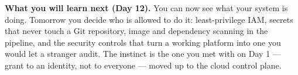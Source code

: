 \begin{keyidea}
\textbf{What you will learn next (Day 12).} You can now see what your system is doing. Tomorrow you decide who is allowed to do it: least-privilege IAM, secrets that never touch a Git repository, image and dependency scanning in the pipeline, and the security controls that turn a working platform into one you would let a stranger audit. The instinct is the one you met with  on Day 1 --- grant to an identity, not to everyone --- moved up to the cloud control plane.
\end{keyidea}
